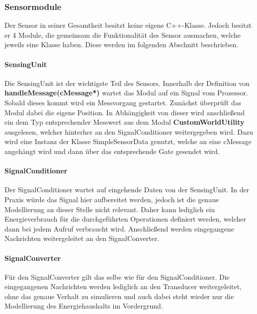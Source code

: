 \subsubsection{Sensormodule}

Der Sensor in seiner Gesamtheit besitzt keine eigene C++-Klasse. Jedoch besitzt er 4 Module, die gemeinsam die Funktionalität des Sensor ausmachen, welche jeweils eine Klasse haben. Diese werden im folgenden Abschnitt beschrieben.

\paragraph{SensingUnit}

Die SensingUnit ist der wichtigste Teil des Sensors. Innerhalb der Definition von \textbf{handleMessage(cMessage*)} wartet das Modul auf ein Signal vom Prozessor. Sobald dieses kommt wird ein Messvorgang gestartet. Zunächst überprüft das Modul dabei die eigene Position. In Abhängigkeit von dieser wird anschließend ein dem Typ entsprechender Messwert aus dem Modul \textbf{CustomWorldUtility} ausgelesen, welcher hinterher an den SignalConditioner weitergegeben wird. Dazu wird eine Instanz der Klasse SimpleSensorData genutzt, welche an eine cMessage angehängt wird und dann über das entsprechende Gate gesendet wird.

\paragraph{SignalConditioner}

Der SignalConditioner wartet auf eingehende Daten von der SensingUnit. In der Praxis würde das Signal hier aufbereitet werden, jedoch ist die genaue Modellierung an dieser Stelle nicht relevant. Daher kann lediglich ein Energieverbrauch für die durchgeführten Operationen definiert werden, welcher dann bei jedem Aufruf verbraucht wird. Anschließend werden eingegangene Nachrichten weitergeleitet an den SignalConverter.

\paragraph{SignalConverter}

Für den SignalConverter gilt das selbe wie für den SignalConditioner. Die eingegangenen Nachrichten werden lediglich an den Transducer weitergeleitet, ohne das genaue Verhalt zu simulieren und auch dabei steht wieder nur die Modellierung des Energiehaushalts im Vordergrund.

